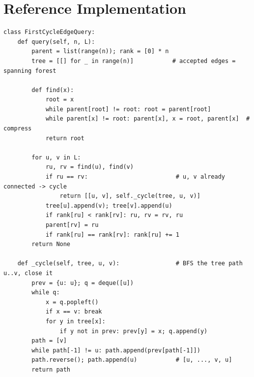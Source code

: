 \documentclass[11pt]{article}
\begin{document}
\section{Reference Implementation}
\begin{lstlisting}[style=py]
class FirstCycleEdgeQuery:
    def query(self, n, L):
        parent = list(range(n)); rank = [0] * n
        tree = [[] for _ in range(n)]           # accepted edges = spanning forest

        def find(x):
            root = x
            while parent[root] != root: root = parent[root]
            while parent[x] != root: parent[x], x = root, parent[x]  # compress
            return root

        for u, v in L:
            ru, rv = find(u), find(v)
            if ru == rv:                         # u, v already connected -> cycle
                return [[u, v], self._cycle(tree, u, v)]
            tree[u].append(v); tree[v].append(u)
            if rank[ru] < rank[rv]: ru, rv = rv, ru
            parent[rv] = ru
            if rank[ru] == rank[rv]: rank[ru] += 1
        return None

    def _cycle(self, tree, u, v):                # BFS the tree path u..v, close it
        prev = {u: u}; q = deque([u])
        while q:
            x = q.popleft()
            if x == v: break
            for y in tree[x]:
                if y not in prev: prev[y] = x; q.append(y)
        path = [v]
        while path[-1] != u: path.append(prev[path[-1]])
        path.reverse(); path.append(u)           # [u, ..., v, u]
        return path
\end{lstlisting}
\end{document}
